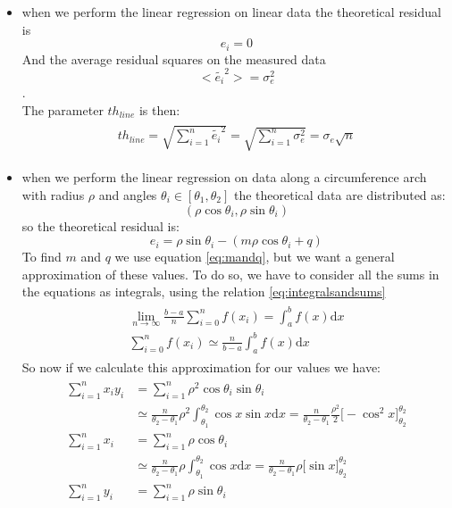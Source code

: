 \begin{itemize}
\begin{itemize}
\item when we perform the linear regression on linear data the theoretical residual is 
$$e_i = 0$$
And the average residual squares on the measured data $$<\tilde{e_i}^2>  = \sigma_e^2$$. \\
The parameter $th_{line}$ is then:
\begin{align}
\begin{split}
th_{line} = \sqrt{\sum_{i=1}^{n}{\tilde{e_i}^2}} = \sqrt{\sum_{i=1}^{n}{\sigma_e^2}} = \sigma_e\sqrt{n}
\end{split}
\end{align}
\item when we perform the linear regression on data along a circumference arch with radius $\rho$ and angles $\theta_i \in [\theta_1,\theta_2]$ the theoretical data are distributed as:
$$(\rho\cos{\theta_i},\rho\sin{\theta_i})$$ 
so the theoretical residual is:
$$e_i = \rho\sin{\theta_i} - (m\rho\cos{\theta_i} + q)$$
To find $m$ and $q$ we use equation \ref{eq:mandq}, but we want a general approximation of these values. To do so, we have  to consider all the sums in the equations as integrals, using the relation \ref{eq:integralsandsums}
\begin{align}
\begin{split}
\lim_{n \to \infty} { \frac{b-a}{n} \sum_{i=0}^{n}{f(x_i)}} =   \int_a^b{f(x )\mathrm  {d}x} \\
 \sum_{i=0}^{n}{f(x_i)} \simeq \frac{n}{b-a} \int_a^b{f(x )\mathrm  {d}x}
\end{split}
\label{eq:integralsandsums}
\end{align} 
So now if we calculate this approximation for our values we have:
\begin{align}
\begin{split}
\sum_{i=1}^{n}{x_iy_i} &= \sum_{i=1}^{n}{\rho^2\cos{\theta_i}\sin{\theta_i}} \\
& \simeq  \frac{n}{\theta_2 - \theta_1}  \rho^2 \int_{\theta_1}^{\theta_2}{\cos{x}\sin{x} \mathrm  {d}x} =  \frac{n}{\theta_2 - \theta_1}  \frac{ \rho^2}{2} \Big[-\cos^2{x} \Big]_{\theta_2}^{\theta_2} \\
 \sum_{i=1}^{n}{x_i} &= \sum_{i=1}^{n}{\rho\cos{\theta_i}} \\
&\simeq  \frac{n}{\theta_2 - \theta_1}  \rho \int_{\theta_1}^{\theta_2}{\cos{x}\mathrm  {d}x} = \frac{n}{\theta_2 - \theta_1}  \rho \Big[\sin{x} \Big]_{\theta_2}^{\theta_2}\\
 \sum_{i=1}^{n}{y_i} &= \sum_{i=1}^{n}{\rho\sin{\theta_i}} \\

\end{split}
\end{align}
\end{itemize}
\end{itemize}
